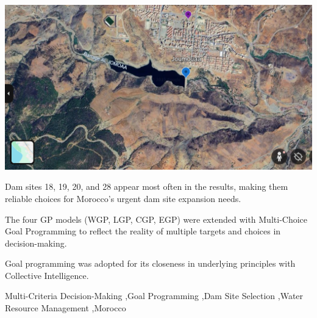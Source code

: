 \begin{frontmatter}
    \begin{graphicalabstract}
        \includegraphics[width=\linewidth]{figures/joumaa}
    \end{graphicalabstract}

    \begin{highlights}
        \item Dam sites 18, 19, 20, and 28 appear most often in the results, making them reliable choices for Morocco's urgent dam site expansion needs.
        \item The four GP models (\gls{WGP}, \gls{LGP}, \gls{CGP}, \gls{EGP}) were extended with Multi-Choice Goal Programming to reflect the reality of multiple targets and choices in decision-making.
        \item Goal programming was adopted for its closeness in underlying principles with Collective Intelligence.
    \end{highlights}

    \begin{keyword}
        Multi-Criteria Decision-Making \sep Goal Programming \sep Dam Site Selection \sep Water Resource Management \sep Morocco
    \end{keyword}

\end{frontmatter}   
